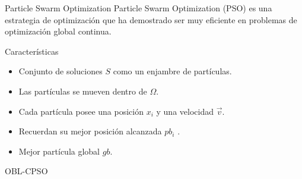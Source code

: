 
\begin{frame}{}
\begin{block}{Particle Swarm Optimization}
Particle Swarm Optimization (PSO) \cite{metabook, comparison, PSO_KA, GPSO} es una estrategia de optimización que ha demostrado ser muy eficiente en problemas de optimización global continua.
 \end{block}
\begin{block}{Características}
\begin{itemize}
	\item Conjunto de soluciones $S$ como un enjambre de partículas.
	\item Las partículas se mueven dentro de $\Omega$.
	\item Cada partícula posee una posición $x_{i}$ y una velocidad $\overrightarrow{v}$.
	\item Recuerdan su mejor posición alcanzada $pb_{i}$ \cite{metabook}.
	\item Mejor partícula global $gb$.
\end{itemize}
 \end{block}
\end{frame}

\begin{frame}{OBL-CPSO}
\centering
\end{frame}


